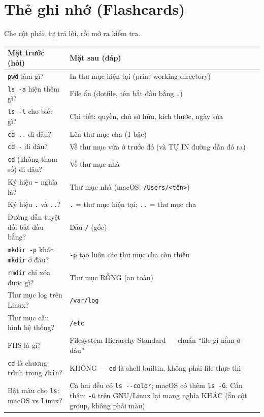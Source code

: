 \documentclass[12pt,a4paper]{article}
\newcommand{\hm}{\textasciitilde{}}
\begin{document}
\section{Thẻ ghi nhớ (Flashcards)}

Che cột phải, tự trả lời, rồi mở ra kiểm tra.

\renewcommand{\arraystretch}{1.4}
\begin{longtable}{>{\raggedright\arraybackslash}p{6cm} >{\raggedright\arraybackslash}p{8.5cm}}
\rowcolor{flashback}
\textbf{Mặt trước (hỏi)} & \textbf{Mặt sau (đáp)} \\
\hline
\endhead
\texttt{pwd} làm gì? & In thư mục hiện tại (print working directory) \\
\texttt{ls -a} hiện thêm gì? & File ẩn (dotfile, tên bắt đầu bằng \texttt{.}) \\
\texttt{ls -l} cho biết gì? & Chi tiết: quyền, chủ sở hữu, kích thước, ngày sửa \\
\texttt{cd ..} đi đâu? & Lên thư mục cha (1 bậc) \\
\texttt{cd -} đi đâu? & Về thư mục vừa ở trước đó (và TỰ IN đường dẫn đó ra) \\
\texttt{cd} (không tham số) đi đâu? & Về thư mục nhà \\
Ký hiệu \texttt{\hm} nghĩa là? & Thư mục nhà (macOS: \texttt{/Users/<tên>}) \\
Ký hiệu \texttt{.} và \texttt{..}? & \texttt{.} = thư mục hiện tại; \texttt{..} = thư mục cha \\
Đường dẫn tuyệt đối bắt đầu bằng? & Dấu \texttt{/} (gốc) \\
\texttt{mkdir -p} khác \texttt{mkdir} ở đâu? & \texttt{-p} tạo luôn các thư mục cha còn thiếu \\
\texttt{rmdir} chỉ xóa được gì? & Thư mục RỖNG (an toàn) \\
Thư mục log trên Linux? & \texttt{/var/log} \\
Thư mục cấu hình hệ thống? & \texttt{/etc} \\
FHS là gì? & Filesystem Hierarchy Standard --- chuẩn ``file gì nằm ở đâu'' \\
\texttt{cd} là chương trình trong \texttt{/bin}? & KHÔNG --- \texttt{cd} là shell builtin, không phải file thực thi \\
Bật màu cho \texttt{ls}: macOS vs Linux? & Cả hai đều có \texttt{ls -{}-color}; macOS có thêm \texttt{ls -G}. Cẩn thận: \texttt{-G} trên GNU/Linux lại mang nghĩa KHÁC (ẩn cột group, không phải màu) \\
\end{longtable}
\renewcommand{\arraystretch}{1}
\end{document}
